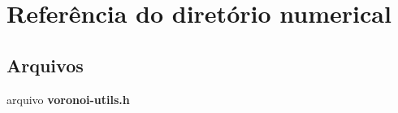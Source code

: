 \section{Referência do diretório numerical}
\label{dir_b7c36c31663319eb4d77cbdb793f4864}
\subsection*{Arquivos}
\begin{DoxyCompactItemize}
\item 
arquivo {\bf voronoi-\/utils.\+h}
\end{DoxyCompactItemize}
